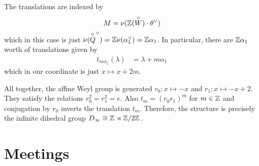 \documentclass[12pt]{article}
\begin{document}
\begin{example}
The translations are indexed by \[M = \nu(\mathbb{Z}(\overset{\circ}{W})\cdot \theta^\vee)\] which in this case is just $\nu(\overset{\circ}{Q}^\vee) = \mathbb{Z} \nu(\alpha_1^\vee) = \mathbb{Z} \alpha_1$. In particular, there are $\mathbb{Z}\alpha_1$ worth of translations given by \begin{align*}
    t_{m\alpha_1}(\lambda) &= \lambda + m\alpha_1 
\end{align*} which in our coordinate is just $x \mapsto x + 2m$. 

All together, the affine Weyl group is generated $r_0:x \mapsto -x$ and $r_1:x \mapsto -x + 2$. They satisfy the relations $r_0^2 = r_1^2 = e$. Also $t_m = (r_0 r_1)^m$ for $m \in \mathbb{Z}$ and conjugation by $r_0$ inverts the translation $t_m$. Therefore, the structure is precisely the infinite dihedral group $D_\infty \cong \mathbb{Z} \rtimes \mathbb{Z}/2\mathbb{Z}$.
\end{example}

\section*{Meetings}
\end{document}
